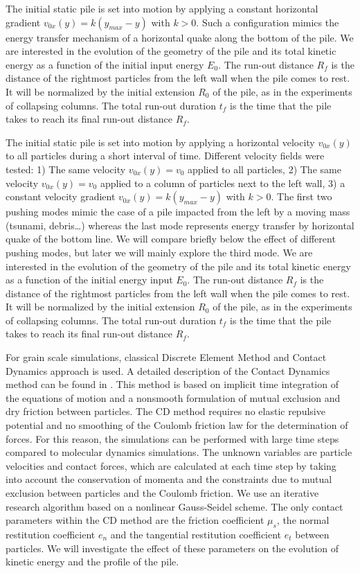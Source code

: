 The initial static pile is set into motion by applying a constant horizontal
gradient  $v_{0x}(y) = k (y_{max} - y)$ with $k>0$. Such a configuration 
mimics the energy transfer mechanism of a horizontal quake along the bottom of 
the pile. We are interested in the evolution of the geometry of the pile 
and its total kinetic energy as a function of the initial input energy $E_0$. 
The run-out distance $R_f$ is the distance of the rightmost particles 
from the left wall when the pile comes to rest.  It will be normalized by the 
initial extension $R_0$ of the pile, as in the experiments of collapsing 
columns. The total run-out duration $t_f$ is the time that the pile takes to 
reach its final run-out distance $R_f$.

The initial static pile is set into motion by applying a horizontal velocity 
$v_{0x}(y)$ to all particles during a short interval of time. Different 
velocity fields were tested: 1) The same velocity $v_{0x}(y) = v_0$ applied to 
all particles, 2) The same velocity $v_{0x}(y) = v_0$ applied to a column of 
particles next to the left wall, 3) a constant velocity gradient  $v_{0x}(y) = 
k (y_{max} - y)$ with $k>0$. The first two pushing modes mimic the case of a 
pile impacted from the left by a moving mass (tsunami, debris\dots) whereas the 
last mode represents energy transfer by horizontal quake of the bottom line. We 
will compare briefly below the effect of different pushing modes, but later we 
will mainly explore the third mode. We are interested in the evolution of the 
geometry of the pile and its total kinetic energy as a function of the initial 
energy input $E_0$. The run-out distance $R_f$ is the distance of the rightmost 
particles from the left wall when the pile comes to rest.  
It will be normalized by the initial extension $R_0$ of the pile, as in 
the experiments of collapsing columns. The total run-out duration $t_f$ is the 
time that the pile takes to reach its final run-out distance $R_f$.       

For grain scale simulations, classical Discrete Element Method and Contact 
Dynamics approach is used. 
A detailed description of the Contact Dynamics 
method can be found in \cite{Moreau1993,Jean1999,Radjai2009,Radjai2011}. 
This method is based on implicit time integration of the equations of motion 
and a nonsmooth formulation of mutual exclusion and dry friction between 
particles. The CD method requires no elastic repulsive potential and no 
smoothing of the Coulomb friction law for the determination of forces. 
For this reason, the simulations can be performed with large time steps 
compared to molecular dynamics simulations. The unknown variables are particle 
velocities and contact forces, which are calculated at each time step by taking 
into account the conservation of momenta and the constraints due to mutual 
exclusion between particles and the Coulomb friction. We use an iterative 
research algorithm based on a nonlinear Gauss-Seidel scheme. The only contact 
parameters within the CD method are the friction coefficient $\mu_s$, the 
normal restitution coefficient $e_n$ and the tangential restitution coefficient 
$e_t$ between particles. We will investigate the effect of these parameters on 
the evolution of kinetic energy and the profile of the pile.     
  
